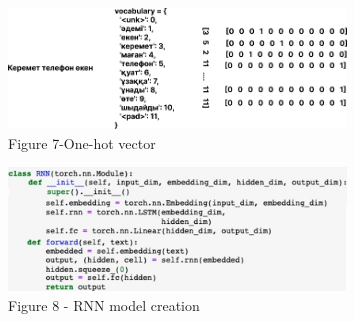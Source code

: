 \begin{figure}[H]
	\centering
	\includegraphics[width=0.8\textwidth]{media/ict/image14}
	\caption*{Figure 7-One-hot vector}
\end{figure}

\begin{figure}[H]
	\centering
	\includegraphics[width=0.8\textwidth]{media/ict/image15}
	\caption*{Figure 8 - RNN model creation}
\end{figure}

